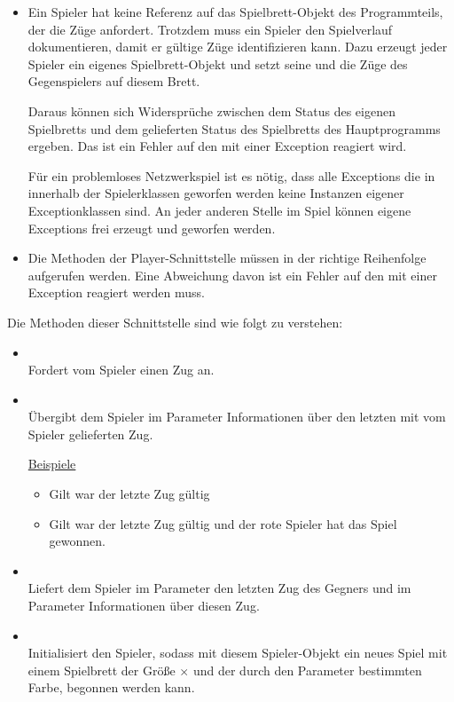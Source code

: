 \begin{enumerate}
\begin{itemize}
\item Ein Spieler hat keine Referenz auf das Spielbrett-Objekt des Programmteils, der die Züge anfordert. Trotzdem muss ein Spieler den Spielverlauf dokumentieren, damit er gültige Züge identifizieren kann. Dazu erzeugt jeder Spieler ein eigenes Spielbrett-Objekt und setzt seine und die Züge des Gegenspielers auf diesem Brett.

Daraus können sich Widersprüche zwischen dem Status des eigenen Spielbretts und dem gelieferten Status des Spielbretts des Hauptprogramms ergeben. Das ist ein Fehler auf den mit einer Exception reagiert wird.

Für ein problemloses Netzwerkspiel ist es nötig, dass alle Exceptions die in innerhalb der Spielerklassen geworfen werden keine Instanzen eigener Exceptionklassen sind. An jeder anderen Stelle im Spiel können eigene Exceptions frei erzeugt und geworfen werden.

\item Die Methoden der Player-Schnittstelle müssen in der richtige Reihenfolge aufgerufen werden. Eine Abweichung davon ist ein Fehler auf den mit einer Exception reagiert werden muss.
\end{itemize}

Die Methoden dieser Schnittstelle sind wie folgt zu verstehen:

\begin{itemize}[leftmargin=4em]
\item[\code{request}] \hfill \\Fordert vom Spieler einen Zug an.
\item[\code{confirm}] \hfill \\Übergibt dem Spieler im Parameter  Informationen über den letzten mit  vom Spieler gelieferten Zug.

\underline{Beispiele}
\begin{itemize}
\item Gilt  war der letzte Zug gültig
\item Gilt  war der letzte Zug gültig und der rote Spieler hat das Spiel gewonnen.
\end{itemize}
\item[\code{update}] \hfill \\Liefert dem Spieler im Parameter  den letzten Zug des Gegners und im Parameter  Informationen über diesen Zug.
\item[\code{init}] \hfill \\Initialisiert den Spieler, sodass mit diesem Spieler-Objekt ein neues Spiel mit einem Spielbrett der Größe  $\times$  und der durch den Parameter  bestimmten Farbe, begonnen werden kann.


\end{itemize}
\end{enumerate}
